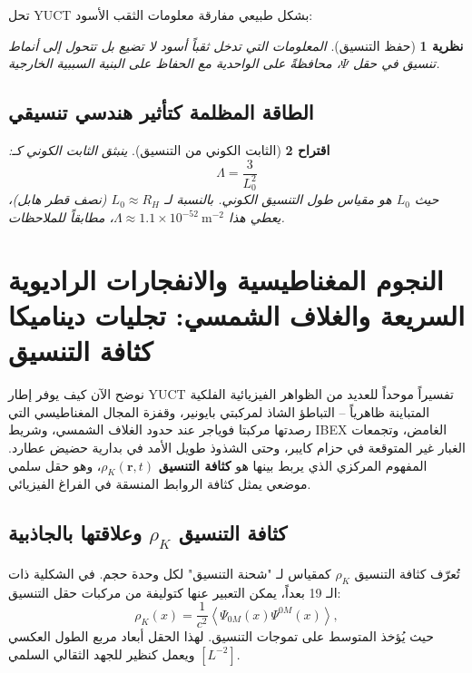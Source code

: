 \documentclass[11pt,a4paper]{article}
\newtheorem{theorem}{نظرية}[section]
\newtheorem{proposition}[theorem]{اقتراح}
\theoremstyle{remark}
\begin{document}
	تحل YUCT بشكل طبيعي مفارقة معلومات الثقب الأسود:
	
	\begin{theorem}[حفظ التنسيق]
		المعلومات التي تدخل ثقباً أسود لا تضيع بل تتحول إلى أنماط تنسيق في حقل $\Psi$، محافظةً على الواحدية مع الحفاظ على البنية السببية الخارجية.
	\end{theorem}
	
	\subsection{الطاقة المظلمة كتأثير هندسي تنسيقي}
	
	\begin{proposition}[الثابت الكوني من التنسيق]
		ينبثق الثابت الكوني كـ:
		\[
		\Lambda = \frac{3}{L_0^2}
		\]
		حيث $L_0$ هو مقياس طول التنسيق الكوني. بالنسبة لـ $L_0 \approx R_H$ (نصف قطر هابل)، يعطي هذا $\Lambda \approx 1.1 \times 10^{-52}\ \text{m}^{-2}$، مطابقاً للملاحظات.
	\end{proposition}
	
	\section{النجوم المغناطيسية والانفجارات الراديوية السريعة والغلاف الشمسي: تجليات ديناميكا كثافة التنسيق}
	\label{sec:coord_density}
	
	نوضح الآن كيف يوفر إطار YUCT تفسيراً موحداً للعديد من الظواهر الفيزيائية الفلكية المتباينة ظاهرياً – التباطؤ الشاذ لمركبتي بايونير، وقفزة المجال المغناطيسي التي رصدتها مركبتا فوياجر عند حدود الغلاف الشمسي، وشريط IBEX الغامض، وتجمعات الغبار غير المتوقعة في حزام كايبر، وحتى الشذوذ طويل الأمد في بدارية حضيض عطارد. المفهوم المركزي الذي يربط بينها هو \textbf{كثافة التنسيق} \(\rho_K(\mathbf{r},t)\)، وهو حقل سلمي موضعي يمثل كثافة الروابط المنسقة في الفراغ الفيزيائي.
	
	\subsection{كثافة التنسيق \(\rho_K\) وعلاقتها بالجاذبية}
	\label{subsec:rho_K_definition}
	
	تُعرّف كثافة التنسيق \(\rho_K\) كمقياس لـ "شحنة التنسيق" لكل وحدة حجم. في الشكلية ذات الـ 19 بعداً، يمكن التعبير عنها كتوليفة من مركبات حقل التنسيق:
	\begin{equation}
		\rho_K(x) = \frac{1}{c^2} \left\langle \Psi_{0M}(x) \Psi^{0M}(x) \right\rangle,
		\label{eq:coord:rho_K_def}
	\end{equation}
	حيث يُؤخذ المتوسط على تموجات التنسيق. لهذا الحقل أبعاد مربع الطول العكسي \([L^{-2}]\) ويعمل كنظير للجهد الثقالي السلمي.
	
\end{document}
